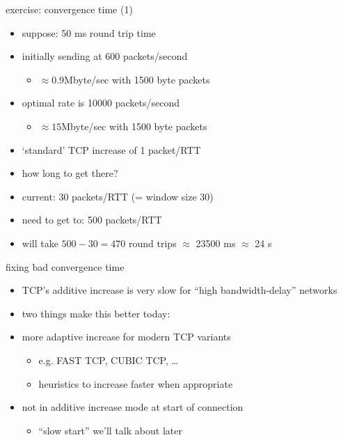 \begin{frame}{exercise: convergence time (1)}
    \begin{itemize}
    \item suppose: 50 ms round trip time
    \item initially sending at 600 packets/second
        \begin{itemize}
        \item $\approx 0.9$Mbyte/sec with 1500 byte packets
        \end{itemize}
    \item optimal rate is 10000 packets/second
        \begin{itemize}
        \item $\approx 15$Mbyte/sec with 1500 byte packets
        \end{itemize}
    \item `standard' TCP increase of 1 packet/RTT
    \item how long to get there?
    \vspace{.5cm}
    \item<2-> current: 30 packets/RTT (= window size 30)
    \item<2-> need to get to: 500 packets/RTT
    \item<2-> will take $500-30=470$ round trips $\approx$ 23500 ms $\approx$ 24 s
    \end{itemize}
\end{frame}

\begin{frame}{fixing bad convergence time}
    \begin{itemize}
    \item TCP's additive increase is very slow for ``high bandwidth-delay'' networks
    \item two things make this better today:
    \vspace{.5cm}
    \item more adaptive increase for modern TCP variants
        \begin{itemize}
        \item e.g. FAST TCP, CUBIC TCP, \ldots
        \item heuristics to increase faster when appropriate
        \end{itemize}
    \item not in additive increase mode at start of connection
        \begin{itemize}
        \item ``slow start'' we'll talk about later
        \end{itemize}
    \end{itemize}
\end{frame}
